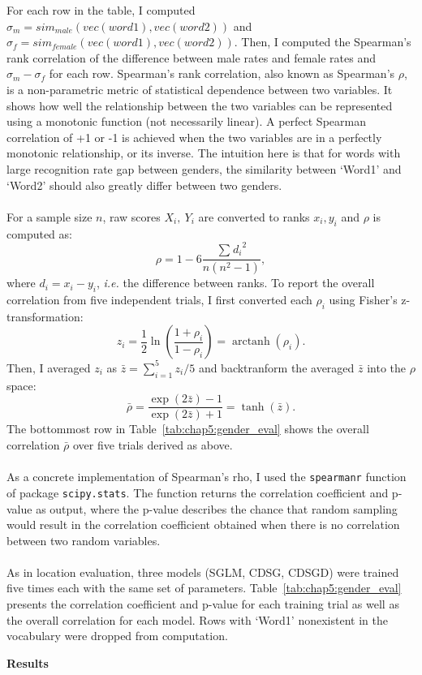 \documentclass[a4paper,12pt,twoside,openright]{report}
\newcommand{\tb}{\vspace{10pt} \textbf}
\newcommand{\ti}{\textit}
\newcommand{\tx}{\texttt}
\newcommand{\nl}{\\ \\}
\DeclareMathOperator{\arctanh}{arctanh}
\begin{document}
For each row in the table, I computed $\sigma_{m} = sim_{male}(vec(word1), vec(word2))$ and $\sigma_{f} = sim_{female}(vec(word1), vec(word2))$. Then, I computed the Spearman's rank correlation of the difference between male rates and female rates and ${\sigma_m} - {\sigma_f}$ for each row. Spearman's rank correlation, also known as Spearman's $\rho$, is a non-parametric metric of statistical dependence between two variables. It shows how well the relationship between the two variables can be represented using a monotonic function (not necessarily linear). A perfect Spearman correlation of +1 or -1 is achieved when the two variables are in a perfectly monotonic relationship, or its inverse. The intuition here is that for words with large recognition rate gap between genders, the similarity between `Word1' and `Word2' should also greatly differ between two genders.
\nl
For a sample size $n$, raw scores $X_i,\: Y_i$ are converted to ranks $x_i, y_i$ and $\rho$ is computed as:
$$\rho = 1-6\frac{\sum_{}^{}{{d_i}^2}}{n(n^2-1)},$$
where $d_i = x_i - y_i$, \ti{i.e.} the difference between ranks. To report the overall correlation from five independent trials, I first converted each $\rho_i$ using Fisher's z-transformation:
$$z_i = \frac{1}{2}\ln(\frac{1+\rho_i}{1-\rho_i})=\arctanh(\rho_i).$$
Then, I averaged $z_i$ as $\bar{z} = {\sum_{i=1}^{5}{z_i}}/{5}$ and backtranform the averaged $\bar{z}$ into the $\rho$ space:
$$\bar\rho = \frac{\exp(2\bar{z})-1}{\exp(2\bar{z})+1} = \tanh(\bar{z}).$$
The bottommost row in Table~\ref{tab:chap5:gender_eval} shows the overall correlation $\bar\rho$ over five trials derived as above.
\nl
As a concrete implementation of Spearman's rho, I used the \tx{spearmanr} function of package \tx{scipy.stats}. The function returns the correlation coefficient and p-value as output, where the p-value describes the chance that random sampling would result in the correlation coefficient obtained when there is no correlation between two random variables. 
\nl
As in location evaluation, three models (SGLM, CDSG, CDSGD) were trained five times each with the same set of parameters. Table~\ref{tab:chap5:gender_eval} presents the correlation coefficient and p-value for each training trial as well as the overall correlation for each model. Rows with `Word1' nonexistent in the vocabulary were dropped from computation. 

\tb{Results}
\end{document}
